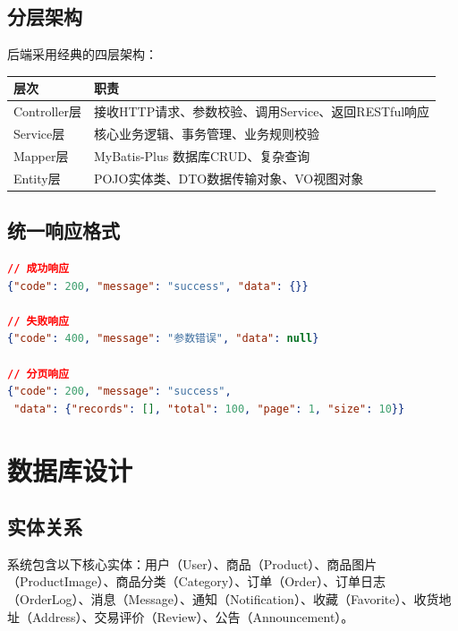 \documentclass[12pt,a4paper,UTF8]{ctexart}
\begin{document}
\subsection{分层架构}

后端采用经典的四层架构：

\begin{longtable}{p{}|p{}}
    \toprule
    \textbf{层次} & \textbf{职责} \\
    \midrule
    \endhead
    \bottomrule
    \endfoot

    Controller层 & 接收HTTP请求、参数校验、调用Service、返回RESTful响应 \\
    Service层 & 核心业务逻辑、事务管理、业务规则校验 \\
    Mapper层 & MyBatis-Plus 数据库CRUD、复杂查询 \\
    Entity层 & POJO实体类、DTO数据传输对象、VO视图对象 \\
\end{longtable}

\subsection{统一响应格式}

\begin{lstlisting}[language=json,breaklines=true]
// 成功响应
{"code": 200, "message": "success", "data": {}}

// 失败响应
{"code": 400, "message": "参数错误", "data": null}

// 分页响应
{"code": 200, "message": "success",
 "data": {"records": [], "total": 100, "page": 1, "size": 10}}
\end{lstlisting}

\section{数据库设计}

\subsection{实体关系}

系统包含以下核心实体：用户（User）、商品（Product）、商品图片（ProductImage）、商品分类（Category）、订单（Order）、订单日志（OrderLog）、消息（Message）、通知（Notification）、收藏（Favorite）、收货地址（Address）、交易评价（Review）、公告（Announcement）。
\end{document}
